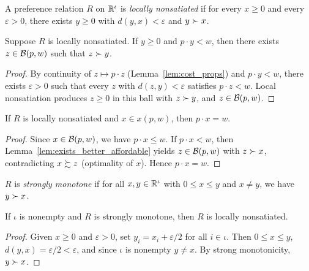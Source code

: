 \begin{definition}
\label{def:lns}
\leanok
{}
A preference relation $R$ on $\mathbb{R}^\iota$ is \emph{locally nonsatiated} if for every
$x \ge 0$ and every $\varepsilon > 0$, there exists $y \ge 0$ with $d(y, x) < \varepsilon$
and $y \succ x$.
\end{definition}

\begin{lemma}
\label{lem:exists_better_affordable}
\leanok
{}
Suppose $R$ is locally nonsatiated. If $y \ge 0$ and $p \cdot y < w$, then there exists
$z \in \mathcal{B}(p, w)$ such that $z \succ y$.
\end{lemma}
\begin{proof}
\leanok
By continuity of $z \mapsto p \cdot z$ (Lemma~\ref{lem:cost_props}) and $p \cdot y < w$,
there exists $\varepsilon > 0$ such that every $z$ with $d(z, y) < \varepsilon$ satisfies
$p \cdot z < w$. Local nonsatiation produces $z \ge 0$ in this ball with $z \succ y$,
and $z \in \mathcal{B}(p, w)$.
\end{proof}

\begin{theorem}
\label{thm:walras_law}
\leanok
{}
If $R$ is locally nonsatiated and $x \in x(p, w)$, then $p \cdot x = w$.
\end{theorem}
\begin{proof}
\leanok
Since $x \in \mathcal{B}(p, w)$, we have $p \cdot x \le w$. If $p \cdot x < w$, then
Lemma~\ref{lem:exists_better_affordable} yields $z \in \mathcal{B}(p, w)$ with $z \succ x$,
contradicting $x \succsim z$ (optimality of $x$). Hence $p \cdot x = w$.
\end{proof}

\begin{definition}
\label{def:stronglyMonotone}
\leanok
{}
$R$ is \emph{strongly monotone} if for all $x, y \in \mathbb{R}^\iota$ with $0 \le x \le y$ and
$x \ne y$, we have $y \succ x$.
\end{definition}

\begin{proposition}
\label{thm:mono_lns}
\leanok
{}
If $\iota$ is nonempty and $R$ is strongly monotone, then $R$ is locally nonsatiated.
\end{proposition}
\begin{proof}
\leanok
Given $x \ge 0$ and $\varepsilon > 0$, set $y_i = x_i + \varepsilon/2$ for all $i \in \iota$.
Then $0 \le x \le y$, $d(y, x) = \varepsilon/2 < \varepsilon$, and since $\iota$ is
nonempty $y \ne x$. By strong monotonicity, $y \succ x$.
\end{proof}

